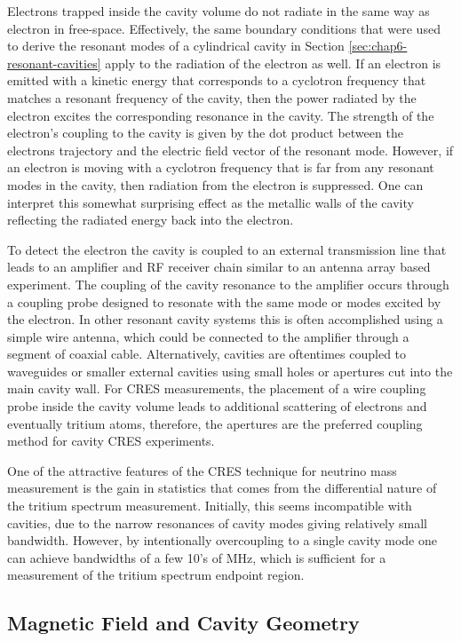 Electrons trapped inside the cavity volume do not radiate in the same way as electron in free-space. Effectively, the same boundary conditions that were used to derive the resonant modes of a cylindrical cavity in Section \ref{sec:chap6-resonant-cavities} apply to the radiation of the electron as well. If an electron is emitted with a kinetic energy that corresponds to a cyclotron frequency that matches a resonant frequency of the cavity, then the power radiated by the electron excites the corresponding resonance in the cavity. The strength of the electron's coupling to the cavity is given by the dot product between the electrons trajectory and the electric field vector of the resonant mode. However, if an electron is moving with a cyclotron frequency that is far from any resonant modes in the cavity, then radiation from the electron is suppressed. One can interpret this somewhat surprising effect as the metallic walls of the cavity reflecting the radiated energy back into the electron. 

To detect the electron the cavity is coupled to an external transmission line that leads to an amplifier and RF receiver chain similar to an antenna array based experiment. The coupling of the cavity resonance to the amplifier occurs through a coupling probe designed to resonate with the same mode or modes excited by the electron. In other resonant cavity systems this is often accomplished using a simple wire antenna,  which could be connected to the amplifier through a segment of coaxial cable. Alternatively, cavities are oftentimes coupled to waveguides or smaller external cavities using small holes or apertures cut into the main cavity wall. For CRES measurements, the placement of a wire coupling probe inside the cavity volume leads to additional scattering of electrons and eventually tritium atoms, therefore, the apertures are the preferred coupling method for cavity CRES experiments.

One of the attractive features of the CRES technique for neutrino mass measurement is the gain in statistics that comes from the differential nature of the tritium spectrum measurement. Initially, this seems incompatible with cavities, due to the narrow resonances of cavity modes giving relatively small bandwidth. However, by intentionally overcoupling to a single cavity mode one can achieve bandwidths of a few 10's of MHz, which is sufficient for a measurement of the tritium spectrum endpoint region.  

\subsection{Magnetic Field and Cavity Geometry}

